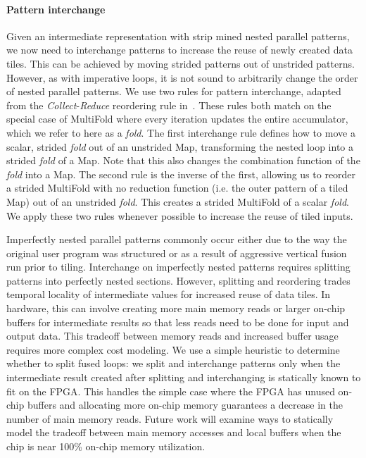 \documentclass[pageno]{jpaper}
\begin{document}
\paragraph{Pattern interchange}
Given an intermediate representation with strip mined nested parallel patterns, we now need to interchange patterns to increase the reuse
of newly created data tiles. This can be achieved by moving strided patterns out of unstrided patterns. However, as with imperative loops,
it is not sound to arbitrarily change the order of nested parallel patterns.
We use two rules for pattern interchange, adapted from the \emph{Collect}-\emph{Reduce} reordering rule in~\cite{brown13clusters}.
These rules both match on the special case of MultiFold where every iteration updates the entire accumulator, which we refer to here as a \emph{fold}.
The first interchange rule defines how to move a scalar, strided \emph{fold} out of an unstrided Map, transforming the nested loop into a strided \emph{fold} of a Map.
Note that this also changes the combination function of the \emph{fold} into a Map.
The second rule is the inverse of the first, allowing us to reorder a strided MultiFold with no reduction function (i.e. the outer pattern of a tiled Map)
out of an unstrided \emph{fold}. This creates a strided MultiFold of a scalar \emph{fold}. We apply these two rules whenever possible to increase the reuse
of tiled inputs.


Imperfectly nested parallel patterns commonly occur either due to the way the original user program was structured or
as a result of aggressive vertical fusion run prior to tiling.
Interchange on imperfectly nested patterns requires splitting patterns into perfectly nested sections. However, splitting and reordering trades
temporal locality of intermediate values for increased reuse of data tiles. In hardware, this can involve creating more main memory
reads or larger on-chip buffers for intermediate results so that less reads need to be done for input and output data. This tradeoff between memory reads and
increased buffer usage requires more complex cost modeling.
We use a simple heuristic to determine whether to split fused loops: we split and interchange patterns only when
the intermediate result created after splitting and interchanging is statically known to fit on the FPGA. This handles the simple case
where the FPGA has unused on-chip buffers and allocating more on-chip memory guarantees a decrease in the number of main memory reads.
Future work will examine ways to statically model the tradeoff between main memory accesses and local buffers when the chip is near 100\% on-chip memory utilization.
\end{document}
